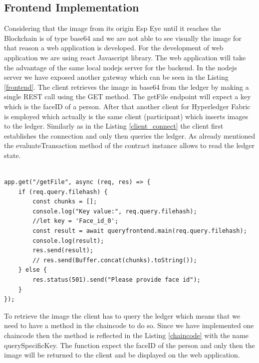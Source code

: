 \subsection{Frontend Implementation}

Considering that the image from its origin Esp Eye until it reaches the Blockchain is of type {\selectfont base64} and we are not able to see visually the image for that reason a web application is developed. For the development of web application we are using react Javascript library. The web application will take the advantage of the same local nodejs server for the backend. In the nodejs server we have exposed another gateway which can be seen in the Listing \ref{frontend}. 
The client retrieves the image in base64 from the ledger by making a single REST call using the GET method. The {\selectfont getFile} endpoint will expect a key which is the faceID of a person. After that another client for Hyperledger Fabric is employed which actually is the same client (participant) which inserts images to the ledger. Similarly as in the Listing \ref{client_connect} the client first establishes the connection and only then queries the ledger. As already mentioned the {\selectfont evaluateTransaction} method of the {\selectfont contract} instance allows to read the ledger state.  

\begin{lstlisting}[caption={The API gateway serving the web application.},label=frontend, captionpos=b]

app.get("/getFile", async (req, res) => {
    if (req.query.filehash) {
        const chunks = [];
        console.log("Key value:", req.query.filehash);
        //let key = 'Face_id_0';
        const result = await queryfrontend.main(req.query.filehash);
        console.log(result);
        res.send(result);
        // res.send(Buffer.concat(chunks).toString());
    } else {
        res.status(501).send("Please provide face id");
    }
});

\end{lstlisting}

To retrieve the image the client has to query the ledger which means that we need to have a method in the chaincode to do so. Since we have implemented one chaincode then the method is reflected in the Listing \ref{chaincode} with the name {\selectfont querySpecificKey}. The function expect the faceID of the person and only then the image will be returned to the client and be displayed on the web application. 









